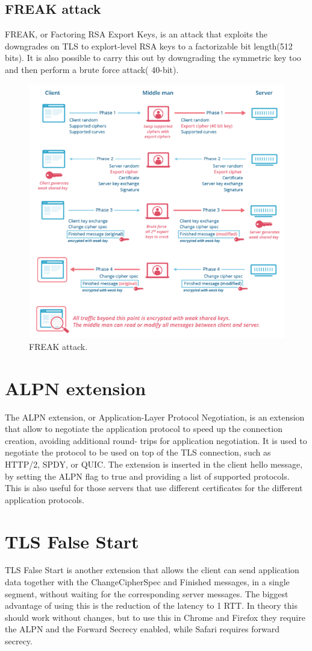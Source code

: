 \documentclass{report}
\begin{document}
\subsection{FREAK attack}
FREAK, or Factoring RSA Export Keys, is an attack that exploits the
downgrades on TLS to explort-level RSA keys to a factorizable bit
length(512 bits). It is also possible to carry this out by downgrading
the symmetric key too and then perform a brute force attack( 40-bit).

\begin{figure}[H]
  \centering
  \includegraphics[width=.6\textwidth]{img/FREAK attack.png}
  \caption{FREAK attack.}
  \label{fig:freak-attack}
\end{figure}

\section{ALPN extension}
The ALPN extension, or Application-Layer Protocol Negotiation, is an
extension that allow to negotiate the application protocol to speed up
the connection creation, avoiding additional round- trips for
application negotiation. It is used to negotiate the protocol to be 
used on top of the TLS connection, such as HTTP/2, SPDY, or QUIC.
The extension is inserted in the client hello message, by setting the
ALPN flag to true and providing a list of supported protocols.
This is also useful for those servers that use different certificates
for the different application protocols.

\section{TLS False Start}
TLS False Start is another extension that allows the client can send
application data together with the ChangeCipherSpec and Finished
messages, in a single segment, without waiting for the corresponding
server messages. The biggest advantage of using this is the reduction
of the latency to 1 RTT. In theory this should work without changes,
but to use this in Chrome and Firefox they require the ALPN and the 
Forward Secrecy enabled, while Safari requires forward secrecy.
\end{document}
